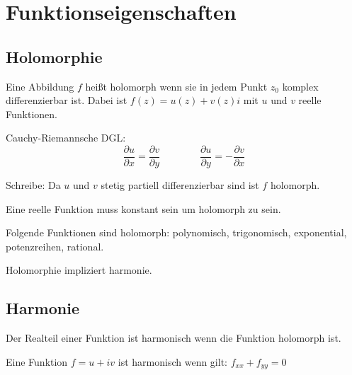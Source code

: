 \documentclass[10pt,a4paper]{article}
\begin{document}
\section{Funktionseigenschaften}
\subsection{Holomorphie}
Eine Abbildung $f$ heißt holomorph wenn sie in jedem Punkt $z_0$ komplex differenzierbar ist. Dabei ist $f(z) = u(z) + v(z)i$ mit $u$ und $v$ reelle Funktionen.

Cauchy-Riemannsche DGL:
\[
\frac{\partial u}{\partial x} = \frac{\partial v}{\partial y}
\,\,\,\,\,\,\,\,\,\,\,\,\,\,\,\,\,\,\,\,\,\,\,\,
\frac{\partial u}{\partial y} = - \frac{\partial v}{\partial x}
\]

Schreibe: Da $u$ und $v$ stetig partiell differenzierbar sind ist $f$ holomorph.

Eine reelle Funktion muss konstant sein um holomorph zu sein.

Folgende Funktionen sind holomorph: polynomisch, trigonomisch, exponential, potenzreihen, rational.

Holomorphie impliziert harmonie.

\subsection{Harmonie}
Der Realteil einer Funktion ist harmonisch wenn die Funktion holomorph ist.

Eine Funktion $f=u + iv$ ist harmonisch wenn gilt: $f_{xx} + f_{yy} = 0$
\end{document}
